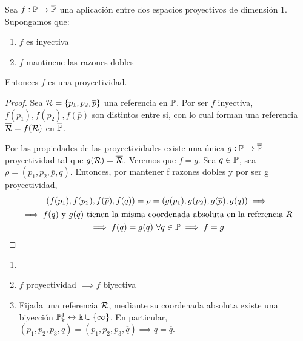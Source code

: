 \begin{teo*} \label{teo:proy_dim_1}
    Sea $f : \mathbb{P} \to \overline{\mathbb{P}}$ una aplicación entre dos espacios proyectivos
    de dimensión $1$.
    Supongamos que:
    \begin{enumerate}
        \item $f$ es inyectiva
        \item $f$ mantinene las razones dobles
    \end{enumerate}
    Entonces $f$ es una proyectividad.
\end{teo*}

\begin{proof}
    Sea $\mathcal{R} = \{p_1, p_2, \overline{p}\}$  una referencia en $\mathbb{P}$. Por ser $f$ inyectiva,
    $f(p_1), f(p_2), f(\overline{p})$ son distintos entre si, con lo cual forman una referencia
    $\overline{\mathcal{R}} = f(\mathcal{R})$ en $\overline{\mathbb{P}}$.

    Por las propiedades de las proyectividades existe una única $g : \mathbb{P} \to \overline{\mathbb{P}}$
    proyectividad tal que $g(\mathcal{R}) = \overline{\mathcal{R}}$. Veremos que $f=g$. Sea $q \in \mathbb{P}$,
    sea $\rho = (p_1, p_2, \overline{p}, q)$. Entonces, por mantener f razones dobles y
    por ser g proyectividad,
    \begin{gather*}
    (f(p_1), f(p_2), f(\overline{p}), f(q)) = \rho = (g(p_1), g(p_2), g(\overline{p}), g(q))
    \implies \\
    \implies f(q) \text{ y } g(q) \text{ tienen la misma coordenada absoluta en la
    referencia } \overline{R} \\
    \implies f(q) = g(q) \ \forall q \in \mathbb{P} \implies f = g
    \end{gather*}
\end{proof}

\begin{obs}
    \begin{enumerate}
      \item[]
      \item $f$ proyectividad $\implies f$ biyectiva
      \item Fijada una referencia $\mathcal{R}$, mediante su coordenada absoluta existe una
      biyección $\mathbb{P}_\Bbbk^1 \leftrightarrow \Bbbk \cup \{\infty\}$. En particular, $(p_1, p_2, p_3,
      q) = (p_1, p_2, p_3, \overline{q}) \implies q = \overline{q}$.
    \end{enumerate}
\end{obs}

